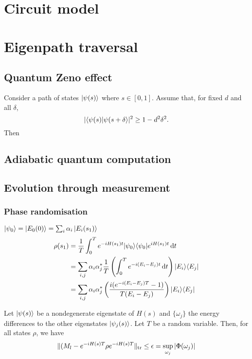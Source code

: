 \chapter{Circuit model}

\chapter{Eigenpath traversal}
\section{Quantum Zeno effect}
\begin{proposition}
Consider a path of states $\left| \psi(s) \right\rangle$ where $s\in[0,1]$. Assume that, for fixed $d$ and all $\delta$,
\[ |\braket{\psi(s)}{\psi(s+\delta}|^2 \geq 1-d^2\delta^2. \]
Then 
\end{proposition}

\section{Adiabatic quantum computation}
\section{Evolution through measurement}
\subsection{Phase randomisation}
$\left| \psi_0 \right\rangle = \left| E_0(0) \right\rangle = \sum_i\alpha_i\left| E_i(s_1) \right\rangle$
\begin{align*}
\rho(s_1) &= \frac{1}{T}\int_0^T e^{-iH(s_1)t}|\psi_0\rangle\langle\psi_0| e^{iH(s_1)t} \operatorname{d \!}{t} \\
&= \sum_{i,j}\alpha_i\alpha_j^* \frac{1}{T}\left(\int_0^T e^{-i(E_i-E_j)t}\operatorname{d \!}{t}\right)|E_i\rangle\langle E_j| \\
&= \sum_{i,j}\alpha_i\alpha_j^* \left(\frac{i(e^{-i(E_i-E_j)T}-1)}{T(E_i-E_j)}\right)|E_i\rangle\langle E_j|
\end{align*}

\begin{theorem}
Let $\left| \psi(s) \right\rangle$ be a nondegenerate eigenstate of $H(s)$ and $\{\omega_j\}$ the energy differences to the other eigenstates $\left| \psi_j(s) \right\rangle$. Let $T$ be a random variable. Then, for all states $\rho$, we have
\[ \lVert(M_l - e^{-iH(s)T}\rho e^{-iH(s)T}\rVert_\text{tr} \leq \epsilon = \sup_{\omega_j}|\Phi(\omega_j)| \]
\end{theorem}

